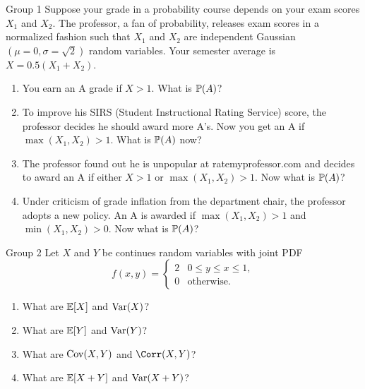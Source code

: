 \documentclass{article}
\begin{document}
\begin{problem}
    {Group 1}
    Suppose your grade in a probability course depends on your exam scores $X_1$ and $X_2$. The professor, a fan of probability, releases exam scores in a normalized fashion such that $X_1$ and $X_2$ are independent Gaussian $(\mu = 0, \sigma=\sqrt{2})$ random variables. Your semester average is $X = 0.5(X_1 + X_2)$.
    \begin{enumerate}
        \item You earn an A grade if $X > 1$. What is $\P{A}$?
        \item To improve his SIRS (Student Instructional Rating Service) score, the professor decides he should award more A's. Now you get an A if $\max(X_1,X_2) > 1$. What is $\P{A}$ now?
        \item The professor found out he is unpopular at ratemyprofessor.com and decides to award an A if either $X >1$ or $\max(X_1,X_2) > 1$. Now what is $\P{A}$?
        \item Under criticism of grade inflation from the department chair, the professor adopts a new policy. An A is awarded if $\max(X_1,X_2) > 1$ and $\min(X_1,X_2) > 0$. Now what is $\P{A}$?
    \end{enumerate}
\end{problem}

\begin{problem}
    {Group 2}
    Let $X$ and $Y$ be continues random variables with joint PDF
    \[
    f(x,y) = {
        \begin{cases}
            2 & 0\leq y\leq x\leq 1,\\
            0 & \text{otherwise.}
        \end{cases}
    }
    \]
    \begin{enumerate}
        \item What are $\E{X}$ and $\mathop{\mathrm{Var}}\nolimits(X)$?
        \item What are $\E{Y}$ and $\mathop{\mathrm{Var}}\nolimits(Y)$?
        \item What are $\mathop{\mathrm{Cov}}\nolimits(X,Y)$ and $\Corr(X,Y)$?
        \item What are $\E{X+Y}$ and $\mathop{\mathrm{Var}}\nolimits(X+Y)$?
    \end{enumerate}
\end{problem}
\end{document}
